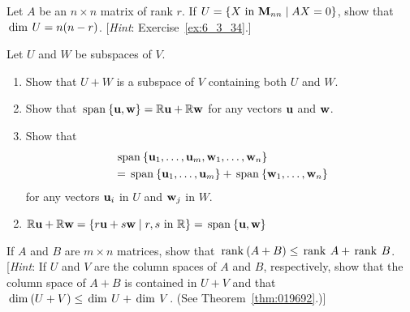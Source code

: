 \begin{multicols}{2}
\begin{ex}
\begin{sol}
\begin{enumerate}[label={\alph*.}]
\end{enumerate}
\end{sol}
\end{ex}

\begin{ex}
Let $A$ be an $n \times n$ matrix of rank $r$. If $U = \{X \mbox{ in } \textbf{M}_{nn} \mid AX = 0\}$, show that $\thinspace\operatorname{dim\medspace} U = n(n - r)$. [\textit{Hint}: Exercise~\ref{ex:6_3_34}.]
\end{ex}

\begin{ex}
Let $U$ and $W$ be subspaces of $V$.

\begin{enumerate}[label={\alph*.}]
\item Show that $U + W$ is a subspace of $V$ containing both $U$ and $W$.

\item Show that $\thinspace\operatorname{span\medspace}\{\textbf{u}, \textbf{w}\} = \mathbb{R}\textbf{u} + \mathbb{R}\textbf{w}$ for any vectors $\textbf{u}$ and $\textbf{w}$.

\item Show that 
\begin{align*}
& \thinspace\operatorname{span\medspace}\{\textbf{u}_{1}, \dots, \textbf{u}_{m}, \textbf{w}_{1}, \dots, \textbf{w}_{n}\} \\ &= \thinspace\operatorname{span\medspace}\{\textbf{u}_{1}, \dots, \textbf{u}_{m}\} + \thinspace\operatorname{span\medspace}\{\textbf{w}_{1}, \dots, \textbf{w}_{n}\}
\end{align*} for any vectors $\textbf{u}_{i}$ in $U$ and $\textbf{w}_{j}$ in $W$.

\end{enumerate}
\begin{sol}
\begin{enumerate}[label={\alph*.}]
\setcounter{enumi}{1}
\item  $\mathbb{R}\textbf{u} + \mathbb{R}\textbf{w} = \{r\textbf{u} + s\textbf{w} \mid r, s \mbox{ in } \mathbb{R}\} = \thinspace\operatorname{span\medspace}\{\textbf{u}, \textbf{w}\}$

\end{enumerate}
\end{sol}
\end{ex}

\begin{ex}
If $A$ and $B$ are $m \times n$ matrices, show that $\thinspace\operatorname{rank\medspace}(A + B) \leq \thinspace\operatorname{rank\medspace}A + \thinspace\operatorname{rank\medspace}B$. [\textit{Hint}: If $U$ and $V$ are the column spaces of $A$ and $B$, respectively, show that the column space of $A + B$ is contained in $U + V$ and that $\thinspace\operatorname{dim\medspace}(U + V) \leq  \thinspace\operatorname{dim\medspace} U + \thinspace\operatorname{dim\medspace} V$. (See Theorem~\ref{thm:019692}.)]
\end{ex}
\end{multicols}
